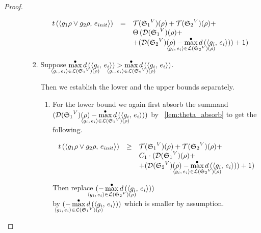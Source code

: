 \begin{proof}
\begin{enumerate}
\begin{enumerate}
\begin{enumerate}
   		\[ \begin{array}{lcl}
		t\,(\taskst{\disjgoal{g_1 \rho}{g_2 \rho}}{e_{init}}) &=& \mathcal{T}(\schemewithvset{\mathfrak{S}_1}{V})(\rho) + \mathcal{T}(\schemewithvset{\mathfrak{S}_2}{V})(\rho) + \\
		& & \Theta\,(\mathcal{D}(\schemewithvset{\mathfrak{S}_1}{V})(\rho) + \\
		& & + (\mathcal{D}(\schemewithvset{\mathfrak{S}_2}{V})(\rho) - \smashoperator{\maxd\limits_{\taskst{g_i}{e_i} \in \mathcal{L}(\schemewithvset{\mathfrak{S}_2}{V})(\rho)}} d\,(\taskst{g_i}{e_i})) + 1) \\
		\end{array} \]
		
		\item Suppose $\smashoperator{\maxd\limits_{\taskst{g_i}{e_i} \in \mathcal{L}(\schemewithvset{\mathfrak{S}_1}{V})(\rho)}} d\,(\taskst{g_i}{e_i}) > \smashoperator{\maxd\limits_{\taskst{g_i}{e_i} \in \mathcal{L}(\schemewithvset{\mathfrak{S}_2}{V})(\rho)}} d\,(\taskst{g_i}{e_i})$.
		
		Then we establish the lower and the upper bounds separately.
		
			\begin{enumerate}
   			\item For the lower bound we again first absorb the summand $(\mathcal{D}(\schemewithvset{\mathfrak{S}_1}{V})(\rho) - \smashoperator{\maxd\limits_{\taskst{g_i}{e_i} \in \mathcal{L}(\schemewithvset{\mathfrak{S}_1}{V})(\rho)}} d\,(\taskst{g_i}{e_i}))$ by \lemmaword~\ref{lem:theta_absorb} to get the following.

			\[ \begin{array}{lcl}
			t\,(\taskst{\disjgoal{g_1 \rho}{g_2 \rho}}{e_{init}}) &\ge& \mathcal{T}(\schemewithvset{\mathfrak{S}_1}{V})(\rho) + \mathcal{T}(\schemewithvset{\mathfrak{S}_2}{V})(\rho) + \\
			& & C_1 \cdot (\mathcal{D}(\schemewithvset{\mathfrak{S}_1}{V})(\rho) + \\
			& & + (\mathcal{D}(\schemewithvset{\mathfrak{S}_2}{V})(\rho) - \smashoperator{\maxd\limits_{\taskst{g_i}{e_i} \in \mathcal{L}(\schemewithvset{\mathfrak{S}_2}{V})(\rho)}} d\,(\taskst{g_i}{e_i})) + 1) \\
			\end{array} \]		
		
			Then replace $(-\smashoperator{\maxd\limits_{\taskst{g_i}{e_i} \in \mathcal{L}(\schemewithvset{\mathfrak{S}_2}{V})(\rho)}} d\,(\taskst{g_i}{e_i}))$ \\ by $(-\smashoperator{\maxd\limits_{\taskst{g_i}{e_i} \in \mathcal{L}(\schemewithvset{\mathfrak{S}_1}{V})(\rho)}} d\,(\taskst{g_i}{e_i}))$ which is smaller by assumption.
		

\end{enumerate}
\end{enumerate}
\end{enumerate}
\end{enumerate}
\end{proof}
